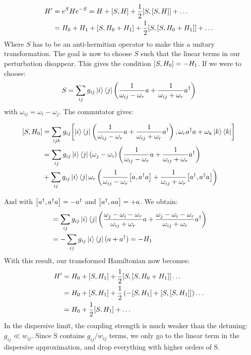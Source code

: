 \begin{align}
    H' &= e^{S} H e^{-S} = H + \comm{S}{H} + \frac{1}{2}\comm{S}{\comm{S}{H}} + \dots \nonumber\\
                        &= H_0 + H_1 + \comm{S}{H_0 + H_1} + \frac{1}{2} \comm{S}{\comm{S}{H_0 + H_1}} + \dots
\end{align}
Where $S$ has to be an anti-hermitian operator to make this a unitary transformation. The goal is now to choose $S$ such that the linear terms in our perturbation disappear. This gives the condition $\comm{S}{H_0} = - H_1$. If we were to choose:
\begin{equation}
    S = \sum_{ij}g_{ij}\ket{i}\bra{j}\left(\frac{1}{\omega_{ij} - \omega_r}a + \frac{1}{\omega_{ij} + \omega_r} a^\dagger \right)
\end{equation}
with $\omega_{ij} = \omega_i - \omega_j$. The commutator gives:
\begin{fullwidth}
\begin{align*}
    \comm{S}{H_0} &= \sum_{ijk}g_{ij}\comm{\ket{i}\bra{j}\left(\frac{1}{\omega_{ij} - \omega_r}a + \frac{1}{\omega_{ij} + \omega_r} a^\dagger \right)}{\omega_r a^\dagger a + \omega_k \ket{k}\bra{k}} \\
    &= \sum_{ij} g_{ij}\ket{i}\bra{j} (\omega_j - \omega_i) \left(\frac{1}{\omega_{ij} - \omega_r}a + \frac{1}{\omega_{ij} + \omega_r} a^\dagger\right) \\
    &+ \sum_{ij} g_{ij} \ket{i}\bra{j} \omega_r \left(\frac{1}{\omega_{ij} - \omega_r} \comm{a}{a^\dagger a}  + \frac{1}{\omega_{ij} + \omega_r} \comm{a^\dagger}{a^\dagger a} \right) 
\end{align*}
\end{fullwidth}
And with $\comm{a^\dagger}{a^\dagger a} = - a^\dagger$ and $\comm{a^\dagger}{a a} = + a$. We obtain:
\begin{align*}
    &= \sum_{ij}g_{ij}\ket{i}\bra{j}\left(\frac{\omega_j - \omega_i - \omega_r}{\omega_{ij} + \omega_r} a + \frac{\omega_j - \omega_i - \omega_r}{\omega_{ij} + \omega_r} a^\dagger  \right) \\
    &= -\sum_{ij}g_{ij}\ket{i}\bra{j}(a + a^\dagger) = - H_1
\end{align*}
With this result, our transformed Hamiltonian now becomes:
\begin{align}
    H' &= H_0 + \comm{S}{H_1} + \frac12\comm{S}{\comm{S}{H_0 + H_1}} \dots \nonumber \\
       &= H_0 + \comm{S}{H_1} + \frac12\left( - \comm{S}{H_1} + \comm{S}{\comm{S}{H_1}}\right) \dots \\
       &= H_0 + \frac12\comm{S}{H_1} + \dots
\end{align}
In the dispersive limit, the coupling strength is much weaker than the detuning: $g_{ij} \ll w_{ij}$. Since S contains $g_{ij} / w_{ij}$ terms, we only go to the linear term in the dispersive approximation, and drop everything with higher orders of S. 

